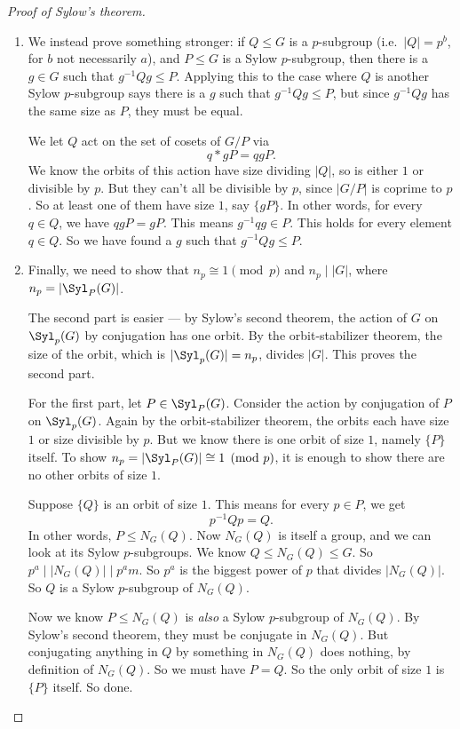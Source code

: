 \documentclass[a4paper]{article}
\begin{document}
\begin{proof}[Proof of Sylow's theorem]
\begin{enumerate}
    \item We instead prove something stronger: if $Q \leq G$ is a $p$-subgroup (i.e.\ $|Q| = p^b$, for $b$ not necessarily $a$), and $P \leq G$ is a Sylow $p$-subgroup, then there is a $g \in G$ such that $g^{-1} Qg \leq P$. Applying this to the case where $Q$ is another Sylow $p$-subgroup says there is a $g$ such that $g^{-1}Qg \leq P$, but since $g^{-1}Qg$ has the same size as $P$, they must be equal.

      We let $Q$ act on the set of cosets of $G/P$ via
      \[
        q * gP = qgP.
      \]
      We know the orbits of this action have size dividing $|Q|$, so is either $1$ or divisible by $p$. But they can't all be divisible by $p$, since $|G/P|$ is coprime to $p$. So at least one of them have size $1$, say $\{gP\}$. In other words, for every $q \in Q$, we have $qgP = gP$. This means $g^{-1}qg \in P$. This holds for every element $q \in Q$. So we have found a $g$ such that $g^{-1}Qg \leq P$.

    \item Finally, we need to show that $n_p \cong 1 \pmod p$ and $n_p \mid |G|$, where $n_p = |\Syl_P(G)|$.

      The second part is easier --- by Sylow's second theorem, the action of $G$ on $\Syl_p(G)$ by conjugation has one orbit. By the orbit-stabilizer theorem, the size of the orbit, which is $|\Syl_p(G)| = n_p$, divides $|G|$. This proves the second part.

      For the first part, let $P \in \Syl_P(G)$. Consider the action by conjugation of $P$ on $\Syl_p(G)$. Again by the orbit-stabilizer theorem, the orbits each have size $1$ or size divisible by $p$. But we know there is one orbit of size $1$, namely $\{P\}$ itself. To show $n_p = |\Syl_P(G)| \cong 1\pmod p$, it is enough to show there are no other orbits of size $1$.

      Suppose $\{Q\}$ is an orbit of size $1$. This means for every $p \in P$, we get
      \[
        p^{-1} Qp = Q.
      \]
      In other words, $P \leq N_G(Q)$. Now $N_G(Q)$ is itself a group, and we can look at its Sylow $p$-subgroups. We know $Q \leq N_G(Q) \leq G$. So $p^a \mid |N_G(Q)| \mid p^a m$. So $p^a$ is the biggest power of $p$ that divides $|N_G(Q)|$. So $Q$ is a Sylow $p$-subgroup of $N_G(Q)$.

      Now we know $P \leq N_G(Q)$ is \emph{also} a Sylow $p$-subgroup of $N_G(Q)$. By Sylow's second theorem, they must be conjugate in $N_G(Q)$. But conjugating anything in $Q$ by something in $N_G(Q)$ does nothing, by definition of $N_G(Q)$. So we must have $P = Q$. So the only orbit of size $1$ is $\{P\}$ itself. So done.\qedhere
  \end{enumerate}
\end{proof}
\end{document}
